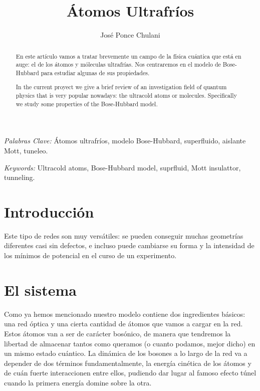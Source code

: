 \documentclass[11pt,a4paper]{article}
\begin{document}
\title{\'Atomos Ultrafr\'ios}
\author{Jos\'e Ponce Chulani}

\maketitle


\bigskip

\begin{abstract}
  En este artículo vamos a tratar brevemente un campo de la física cuántica que está en auge: el de los \'atomos y m\'oleculas ultrafr\'ias. Nos centraremos en el modelo de Bose-Hubbard para estudiar algunas de sus propiedades.
\end{abstract}

\bigskip

\textit{Palabras Clave:}
Átomos ultrafríos, modelo Bose-Hubbard, superfluido, aislante Mott, tuneleo.

 

\begin{abstract}
  In the current proyect we give a brief review of an investigation field of quantum physics that is very popular nowadays: the ultracold atoms or molecules. Specifically we study some properties of the Bose-Hubbard model. 
\end{abstract}

\bigskip

\textit{Keywords:}
Ultracold atoms, Bose-Hubbard model, suprfluid, Mott insulattor, tunneling.



\section{Introducción}

Este tipo de redes son muy versátiles: se pueden conseguir muchas geometrías diferentes casi sin defectos, e incluso puede cambiarse su forma y la intensidad de los mínimos de potencial en el curso de un experimento. 


\section{El sistema}

Como ya hemos mencionado nuestro modelo contiene dos ingredientes básicos: una red óptica y una cierta cantidad de átomos que vamos a cargar en la red. Estos átomos van a ser de carácter bosónico, de manera que tendremos la libertad de almacenar tantos como queramos (o cuanto podamos, mejor dicho) en un mismo estado cuántico. La dinámica de los bosones a lo largo de la red va a depender de dos términos fundamentalmente, la energía cinética de los átomos y de cuán fuerte interaccionen entre ellos, pudiendo dar lugar al famoso efecto túnel cuando la primera energía domine sobre la otra.
\end{document}
